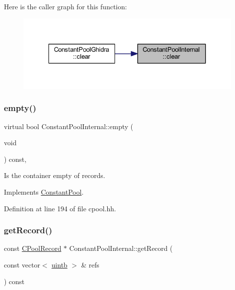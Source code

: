 Here is the caller graph for this function\+:
\nopagebreak
\begin{figure}[H]
\begin{center}
\leavevmode
\includegraphics[width=327pt]{class_constant_pool_internal_a72e240485b635c1e82282d1ae0cbd7d5_icgraph}
\end{center}
\end{figure}
\mbox{\label{class_constant_pool_internal_a4de2decea0379233ebd272c8eb72355d}} 
\subsubsection{\texorpdfstring{empty()}{empty()}}
{\footnotesize\ttfamily virtual bool Constant\+Pool\+Internal\+::empty (\begin{DoxyParamCaption}\item[{void}]{ }\end{DoxyParamCaption}) const\hspace{0.3cm}{\ttfamily [inline]}, {\ttfamily [virtual]}}



Is the container empty of records. 



Implements \mbox{\hyperlink{class_constant_pool_a22bef84ddc137d871c05a55c5757a3e1}{Constant\+Pool}}.



Definition at line 194 of file cpool.\+hh.

\mbox{\label{class_constant_pool_internal_a28cbe88a2aa77b21bbf7a8027485ad37}} 
\subsubsection{\texorpdfstring{getRecord()}{getRecord()}}
{\footnotesize\ttfamily const \mbox{\hyperlink{class_c_pool_record}{C\+Pool\+Record}} $\ast$ Constant\+Pool\+Internal\+::get\+Record (\begin{DoxyParamCaption}\item[{const vector$<$ \mbox{\hyperlink{types_8h_a2db313c5d32a12b01d26ac9b3bca178f}{uintb}} $>$ \&}]{refs }\end{DoxyParamCaption}) const\hspace{0.3cm}{\ttfamily [virtual]}}



